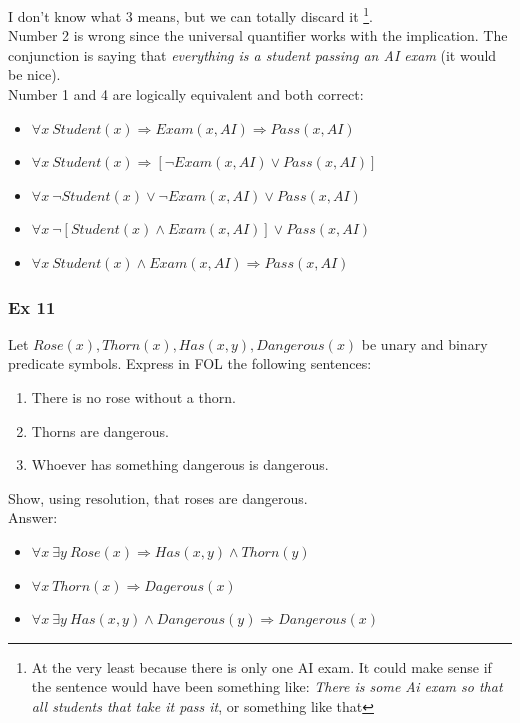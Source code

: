 \documentclass[10pt,a4paper]{article}
\begin{document}
\begin{itemize}
\begin{enumerate}
\end{enumerate}

I don't know what 3 means, but we can totally discard it \footnote{At the very least because there is only one AI exam. It could make sense if the sentence would have been something like: \textit{There is some Ai exam so that all students that take it pass it}, or something like that}.\\
Number 2 is wrong since the universal quantifier works with the implication. The conjunction is saying that \textit{everything is a student passing an AI exam} (it would be nice).\\
Number 1 and 4 are logically equivalent and both correct:
\begin{itemize}
\item $\forall x\ Student(x)\Rightarrow Exam(x, AI)\Rightarrow Pass(x,AI)$
\item $\forall x\ Student(x)\Rightarrow [\neg Exam(x, AI)\vee Pass(x,AI)]$
\item $\forall x\ \neg Student(x)\vee \neg Exam(x, AI)\vee Pass(x,AI)$
\item $\forall x\ \neg [Student(x)\wedge  Exam(x, AI)]\vee Pass(x,AI)$
\item $\forall x\ Student(x)\wedge  Exam(x, AI)\Rightarrow Pass(x,AI)$
\end{itemize} 

\subsubsection{Ex 11}
Let $Rose(x),Thorn(x), Has(x, y), Dangerous(x)$ be unary and binary predicate symbols. Express in FOL the following sentences:
\begin{enumerate}
\item There is no rose without a thorn.
\item Thorns are dangerous.
\item Whoever has something dangerous is dangerous.
\end{enumerate}
Show, using resolution, that roses are dangerous.\\

Answer:
\begin{itemize}
\item $\forall x\ \exists y \ Rose(x) \Rightarrow Has(x,y)\wedge Thorn(y)$
\item $\forall x\ Thorn(x) \Rightarrow Dagerous(x)$
\item $\forall x\ \exists y\ Has(x,y)\wedge Dangerous(y) \Rightarrow Dangerous(x)$
\end{itemize}


\end{itemize}
\end{document}
